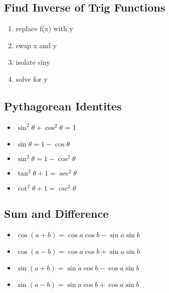 \documentclass{report}
\begin{document}
      \bigbreak \noindent \bigbreak \noindent 
      \subsection{Find Inverse of Trig Functions}
        \begin{enumerate}
          \item replace f(x) with y
          \item swap x and y
          \item isolate siny
          \item solve for y
        \end{enumerate}

      \bigbreak \noindent \bigbreak \noindent 
      \subsection{Pythagorean Identites}
      \begin{itemize}
        \item $ \sin^{2}{\theta} + \cos^{2}{\theta}$ = 1
        \item $\sin{\theta }  = 1-\cos{\theta }$
        \item $\sin^{2}{\theta }  = 1-\cos^{2}{\theta }$
        \item $\tan^{2}{\theta} +1 = \sec^{2}{\theta}$
        \item $\cot^{2}{\theta } + 1 = \csc^{2}{\theta }$
      \end{itemize}

      \bigbreak \noindent \bigbreak \noindent 
      \subsection{Sum and Difference}
      \begin{itemize}
        \item $\cos{(a+b)} = \cos{a}\cos{b}-\sin{a}\sin{b} $
        \item $\cos{(a-b)} = \cos{a}\cos{b}+\sin{a}\sin{b} $
        \item $\sin{(a+b)} = \sin{a}\cos{b}-\cos{a}\sin{b} $
        \item $\sin{(a-b)} = \sin{a}\cos{b}+\cos{a}\sin{b} $
      \end{itemize}

      \bigbreak \noindent \bigbreak \noindent 
\end{document}
